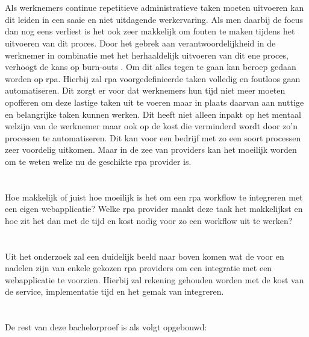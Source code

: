 \section{}
\label{sec:probleemstelling}
Als werknemers continue repetitieve administratieve taken moeten uitvoeren kan dit leiden in een saaie en niet uitdagende werkervaring. Als men daarbij de focus dan nog eens verliest is het ook zeer makkelijk om fouten te maken tijdens het uitvoeren van dit proces. Door het gebrek aan verantwoordelijkheid in de werknemer in combinatie met het herhaaldelijk uitvoeren van dit ene proces, verhoogt de kans op burn-outs \autocite{burnout}. Om dit alles tegen te gaan kan beroep gedaan worden op \acrlong{rpa}. Hierbij zal \acrshort{rpa} voorgedefinieerde taken volledig en foutloos gaan automatiseren. Dit zorgt er voor dat werknemers hun tijd niet meer moeten opofferen om deze lastige taken uit te voeren maar in plaats daarvan aan nuttige en belangrijke taken kunnen werken. Dit heeft niet alleen inpakt op het mentaal welzijn van de werknemer maar ook op de kost die verminderd wordt door zo'n processen te automatiseren. Dit kan voor een bedrijf met zo een soort processen zeer voordelig uitkomen. Maar in de zee van providers kan het moeilijk worden om te weten welke nu de geschikte \acrshort{rpa} provider is.

\section{}
\label{sec:onderzoeksvraag}
Hoe makkelijk of juist hoe moeilijk is het om een \acrshort{rpa} workflow te integreren met een eigen webapplicatie? Welke \acrshort{rpa} provider maakt deze taak het makkelijkst en hoe zit het dan met de tijd en kost nodig voor zo een workflow uit te werken?


\section{}
\label{sec:onderzoeksdoelstelling}
Uit het onderzoek zal een duidelijk beeld naar boven komen wat de voor en nadelen zijn van enkele gekozen \acrshort{rpa} providers om een integratie met een webapplicatie te voorzien. Hierbij zal rekening gehouden worden met de kost van de service, implementatie tijd en het gemak van integreren.

\section{}
\label{sec:opzet-bachelorproef}
De rest van deze bachelorproef is als volgt opgebouwd:

